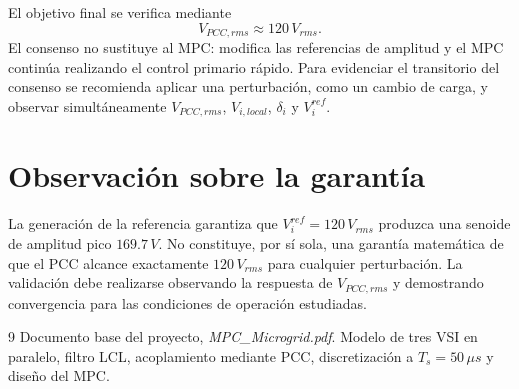 \documentclass[12pt,a4paper]{article}
\begin{document}
El objetivo final se verifica mediante
\begin{equation}
\boxed{V_{PCC,rms}\approx120\,V_{rms}}.
\end{equation}
El consenso no sustituye al MPC: modifica las referencias de amplitud y el MPC continúa realizando el control primario rápido. Para evidenciar el transitorio del consenso se recomienda aplicar una perturbación, como un cambio de carga, y observar simultáneamente $V_{PCC,rms}$, $V_{i,local}$, $\delta_i$ y $V_i^{ref}$.

\section{Observación sobre la garantía}
La generación de la referencia garantiza que $V_i^{ref}=120\,V_{rms}$ produzca una senoide de amplitud pico $169.7\,V$. No constituye, por sí sola, una garantía matemática de que el PCC alcance exactamente $120\,V_{rms}$ para cualquier perturbación. La validación debe realizarse observando la respuesta de $V_{PCC,rms}$ y demostrando convergencia para las condiciones de operación estudiadas.

\begin{thebibliography}{9}
Documento base del proyecto, \textit{MPC\_Microgrid.pdf}. Modelo de tres VSI en paralelo, filtro LCL, acoplamiento mediante PCC, discretización a $T_s=50\,\mu s$ y diseño del MPC.
\end{thebibliography}
\end{document}
